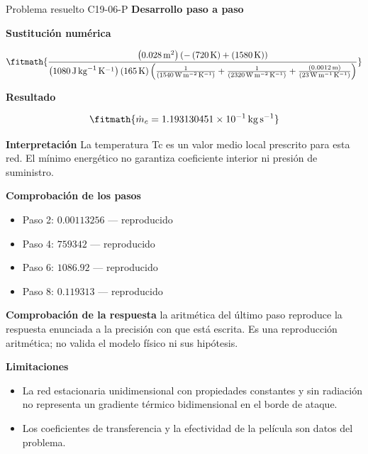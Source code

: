 \documentclass[10pt,openany]{book}
\begin{document}
\begin{studiumworked}{Problema resuelto C19-06-P}
\noindent\textbf{Desarrollo paso a paso}



\noindent\textbf{Sustitución numérica}

\[
\fitmath{\frac{\left(0.028\,\mathrm{m}^{2}\right) \left(- \left(720\,\mathrm{K}\right) + \left(1580\,\mathrm{K}\right)\right)}{\left(1080\,\mathrm{J}\,\mathrm{kg}^{-1}\,\mathrm{K}^{-1}\right) \left(165\,\mathrm{K}\right) \left(\frac{1}{\left(1540\,\mathrm{W}\,\mathrm{m}^{-2}\,\mathrm{K}^{-1}\right)} + \frac{1}{\left(2320\,\mathrm{W}\,\mathrm{m}^{-2}\,\mathrm{K}^{-1}\right)} + \frac{\left(0.0012\,\mathrm{m}\right)}{\left(23\,\mathrm{W}\,\mathrm{m}^{-1}\,\mathrm{K}^{-1}\right)}\right)}}
\]

\noindent\textbf{Resultado}

\[
\fitmath{\dot{m}_c=1.193130451\times10^{-1}\,\mathrm{kg}\,\mathrm{s}^{-1}}
\]

\noindent\textbf{Interpretación}
La temperatura Tc es un valor medio local prescrito para esta red. El mínimo energético no garantiza coeficiente interior ni presión de suministro.

\noindent\textbf{Comprobación de los pasos}
\begin{itemize}
\item Paso 2: $0.00113256$ — reproducido
\item Paso 4: $759342$ — reproducido
\item Paso 6: $1086.92$ — reproducido
\item Paso 8: $0.119313$ — reproducido
\end{itemize}

\noindent\textbf{Comprobación de la respuesta} la aritmética del último paso reproduce la respuesta enunciada a la precisión con que está escrita. Es una reproducción aritmética; no valida el modelo físico ni sus hipótesis.

\noindent\textbf{Limitaciones}
\begin{itemize}
\item La red estacionaria unidimensional con propiedades constantes y sin radiación no representa un gradiente térmico bidimensional en el borde de ataque.
\item Los coeficientes de transferencia y la efectividad de la película son datos del problema.
\end{itemize}


\end{studiumworked}
\end{document}
